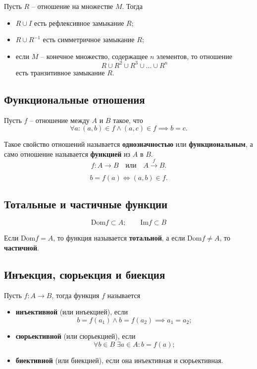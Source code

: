 \begin{theorem*}
    Пусть \(R\) -- отношение на множестве \(M\). Тогда
    \begin{itemize}
        \item \(R \cup I\) есть рефлексивное замыкание \(R\);
        \item \(R \cup R^{-1}\) есть симметричное замыкание \(R\);
        \item если \(M\) -- конечное множество, содержащее \(n\) элементов, то отношение
              \[
                  R \cup R^2 \cup R^3 \cup \ldots \cup R^n
              \]
              есть транзитивное замыкание \(R\).
    \end{itemize}
\end{theorem*}

\subsection{Функциональные отношения}

Пусть \(f\) -- отношение между \(A\) и \(B\) такое, что
\[
    \forall a : (a, b) \in f \land (a, c) \in f \implies b = c.
\]

Такое свойство отношений называется \textbf{однозначностью} или \textbf{функциональным}, а само отношение называется \textbf{функцией} из \(A\) в \(B\).
\[
    f: A \to B \quad \text{или} \quad A \stackrel{f}{\to} B.
\]

\[
    b = f(a) \iff (a, b) \in f.
\]

\subsection{Тотальные и частичные функции}

\[
    \text{Dom} f \subset A;
    \qquad
    \text{Im} f \subset B
\]

Если \(\text{Dom} f = A\), то функция называется \textbf{тотальной}, а если \(\text{Dom} f \neq A\), то \textbf{частичной}.

\subsection{Инъекция, сюрьекция и биекция}

Пусть \(f: A \to B\), тогда функция \(f\) называется
\begin{itemize}
    \item \textbf{инъективной} (или инъекцией), если
          \[
              b = f(a_1) \land b = f(a_2) \implies a_1 = a_2;
          \]
    \item \textbf{сюрьективной} (или сюрьекцией), если
          \[
              \forall b \in B \; \exists a \in A : b = f(a);
          \]
    \item \textbf{биективной} (или биекцией), если она инъективная и сюрьективная.
\end{itemize}

